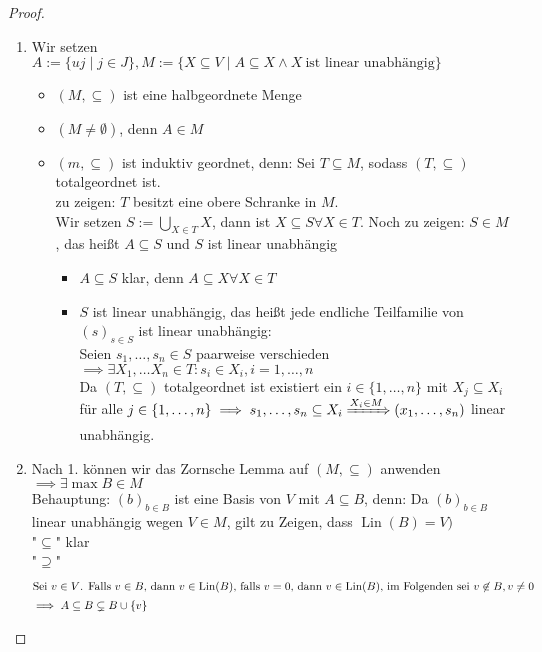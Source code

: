 \documentclass[a4paper]{scrartcl}
\DeclareMathOperator{\Exists}{\exists}
\DeclareMathOperator{\Forall}{\forall}
\DeclareMathOperator{\Lin}{Lin}
\theoremstyle{definition}
\theoremstyle{plain}
\theoremstyle{plain}
\theoremstyle{remark}
\theoremstyle{remark}
\theoremstyle{remark}
\theoremstyle{remark}
\theoremstyle{remark}
\begin{document}
\begin{proof}
\begin{enumerate}
\item Wir setzen $A:= \{uj \mid j \in J\}, M:= \{X \subseteq V \mid A\subseteq X \wedge X ~\text{ist linear unabhängig}\}$
\begin{itemize}
\item $(M, \subseteq)$ ist eine halbgeordnete Menge
\item $(M \neq \emptyset)$, denn $A\in M$
\item $(m, \subseteq)$ ist induktiv geordnet, denn:
Sei $T\subseteq M$, sodass $(T,\subseteq)$ totalgeordnet ist. \\
       zu zeigen: $T$ besitzt eine obere Schranke in $M$. \\
       Wir setzen $\displaystyle S:= \bigcup_{X\in T} X$, dann ist $X\subseteq S \Forall X\in T$.
Noch zu zeigen: $S\in M$, das heißt $A\subseteq S$ und $S$ ist linear unabhängig
\begin{itemize}
\item $A\subseteq S$ klar, denn $A\subseteq X\Forall X\in T$
\item $S$ ist linear unabhängig, das heißt jede endliche Teilfamilie von $(s)_{s\in S}$ ist linear unabhängig: \\
         Seien $s_1, \ldots, s_n \in S$ paarweise verschieden $\implies \Exists X_1, \ldots X_n \in T: s_i \in X_i, i = 1, \ldots, n$ \\
         Da $(T, \subseteq)$ totalgeordnet ist existiert ein $i\in \{1, \ldots, n\}$ mit $X_j \subseteq X_i$ für alle $j\in \{1,\ldots,n\} \implies s_1, \ldots, s_n \subseteq X_i \xRightarrow{X_i \in M} (x_1, \ldots, s_n)$ linear unabhängig.
\end{itemize}
\end{itemize}
\item Nach 1. können wir das Zornsche Lemma auf $(M,\subseteq)$ anwenden $\implies \Exists \max B \in M$ \\
     Behauptung: $(b)_{b\in B}$ ist eine Basis von $V$ mit $A\subseteq B$, denn: Da $(b)_{b\in B}$ linear unabhängig wegen $V\in M$, gilt zu Zeigen, dass $\Lin(B) = V)$ \\
     "$\subseteq$" klar \\
     "$\supseteq$"
\begin{align*}
\intertext{Sei $v \in V$. Falls $v\in B$, dann $v\in\Lin(B)$, falls $v = 0$, dann $v\in \Lin(B)$, im Folgenden sei $v\not\in B, v\neq 0$}
\implies A \subseteq B \subsetneq B\cup \{v\} \\

\end{align*}
\end{enumerate}
\end{proof}
\end{document}
